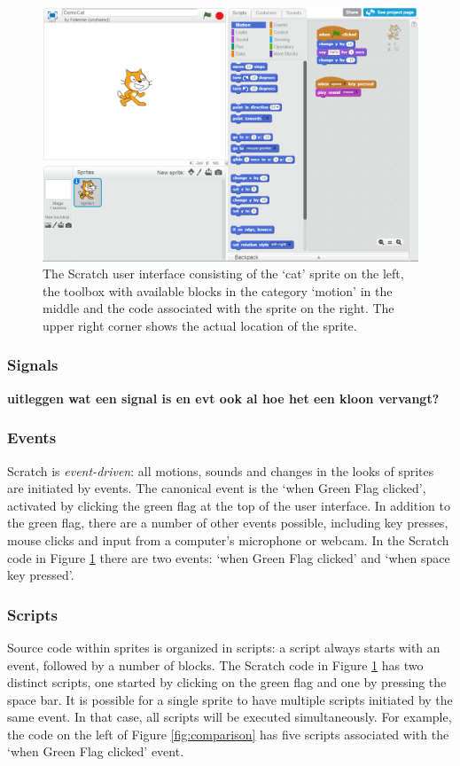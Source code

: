 \documentclass{sig-alternate}
\newcommand{\todo}[1]{\textbf{#1}}
\begin{document}
\begin{figure}
	\begin{center}
		\includegraphics[width=\columnwidth]{fig/ui.png}
		\caption{The Scratch user interface consisting of the `cat' sprite on the left, the toolbox with available blocks in the category `motion' in the middle and the code associated with the sprite on the right. The upper right corner shows the actual location of the sprite.}
		\label{fig:ui}
	\end{center}
\end{figure} 

\subsubsection{Signals}
\todo{uitleggen wat een signal is en evt ook al hoe het een kloon vervangt?}

\subsubsection{Events}
Scratch is \emph{event-driven}: all motions, sounds and changes in the looks of sprites are initiated by events. The canonical event is the `when Green Flag clicked', activated by clicking the green flag at the top of the user interface. In addition to the green flag, there are a number of other events possible, including key presses, mouse clicks and input from a computer's microphone or webcam. In the Scratch code in Figure \ref{fig:ui} there are two events: `when Green Flag clicked' and `when space key pressed'.

\subsubsection{Scripts}
Source code within sprites is organized in scripts: a script always starts with an event, followed by a number of blocks. The Scratch code in Figure \ref{fig:ui} has two distinct scripts, one started by clicking on the green flag and one by pressing the space bar. It is possible for a single sprite to have multiple scripts initiated by the same event. In that case, all scripts will be executed simultaneously. For example, the code on the left of Figure \ref{fig:comparison} has five scripts associated with the `when Green Flag clicked' event.
\end{document}
